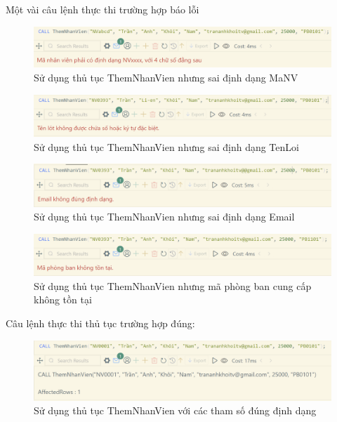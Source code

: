 \newpage
Một vài câu lệnh thực thi trường hợp báo lỗi
\begin{figure}[H]
    \centering
    \includegraphics[width=\linewidth]{content/images/ThemNhanVien_LoiMaNV.png}
    \caption{Sử dụng thủ tục ThemNhanVien nhưng sai định dạng MaNV}
    \label{fig:ThemNhanVien_LoiMaNV}
\end{figure}
\begin{figure}[H]
    \centering
    \includegraphics[width=\linewidth]{content/images/ThemNhanVien_LoiTenLot.png}
    \caption{Sử dụng thủ tục ThemNhanVien nhưng sai định dạng TenLoi}
    \label{fig:ThemNhanVien_LoiTenLot}
\end{figure}
\begin{figure}[H]
    \centering
    \includegraphics[width=\linewidth]{content/images/ThemNhanVien_LoiEmail.png}
    \caption{Sử dụng thủ tục ThemNhanVien nhưng sai định dạng Email}
    \label{fig:ThemNhanVien_LoiEmail}
\end{figure}
\begin{figure}[H]
    \centering
    \includegraphics[width=\linewidth]{content/images/ThemNhanVien_LoiPhongBan.png}
    \caption{Sử dụng thủ tục ThemNhanVien nhưng mã phòng ban cung cấp không tồn tại}
    \label{fig:ThemNhanVien_LoiPhongBan}
\end{figure}

Câu lệnh thực thi thủ tục trường hợp đúng:
\begin{figure}[H]
    \centering
    \includegraphics[width=\linewidth]{content/images/ThemNhanVien_ThanhCong.png}
    \caption{Sử dụng thủ tục ThemNhanVien với các tham số đúng định dạng}
    \label{fig:ThemNhanVien_ThanhCong}
\end{figure}

